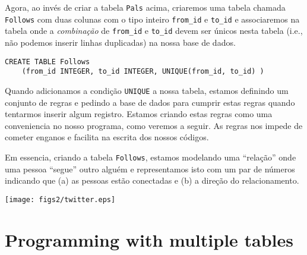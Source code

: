 
Agora, ao invés de criar a tabela {\tt Pals} acima, criaremos uma tabela
chamada {\tt Follows} com duas colunas com o tipo inteiro \verb"from_id" e
\verb"to_id" e associaremos na tabela onde a \emph{combinação} de
\verb"from_id" e \verb"to_id" devem ser únicos nesta tabela (i.e., não podemos
inserir linhas duplicadas) na nossa base de dados.

\beforeverb
\begin{verbatim}
CREATE TABLE Follows 
    (from_id INTEGER, to_id INTEGER, UNIQUE(from_id, to_id) )
\end{verbatim}
\afterverb
%

Quando adicionamos a condição {\tt UNIQUE} a nossa tabela, estamos definindo
um conjunto de regras e pedindo a base de dados para cumprir estas regras
quando tentarmos inserir algum registro. Estamos criando estas regras como uma
conveniencia no nosso programa, como veremos a seguir. As regras nos impede de
cometer enganos e facilita na escrita dos nossos códigos.


Em essencia, criando a tabela {\tt Follows}, estamos modelando uma ``relação''
onde uma pessoa ``segue'' outro alguém e representamos isto com um par de
números indicando que (a) as pessoas estão conectadas e (b) a direção do
relacionamento.

\beforefig
\centerline{\texttt{[image: figs2/twitter.eps]}}
\afterfig


\section{Programming with multiple tables}

